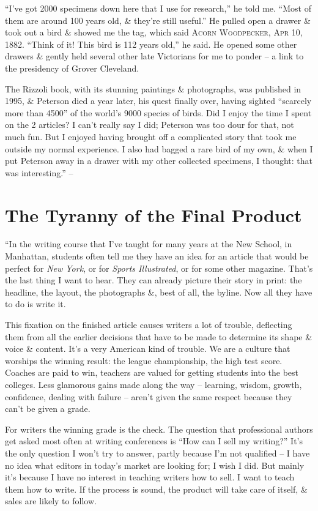 \documentclass{article}
\numberwithin{equation}{section}
\begin{document}
``I've got 2000 specimens down here that I use for research,'' he told me. ``Most of them are around 100 years old, \& they're still useful.'' He pulled open a drawer \& took out a bird \& showed me the tag, which said \textsc{Acorn Woodpecker, Apr 10, 1882}. ``Think of it! This bird is 112 years old,'' he said. He opened some other drawers \& gently held several other late Victorians for me to ponder -- a link to the presidency of Grover Cleveland.

The Rizzoli book, with its stunning paintings \& photographs, was published in 1995, \& Peterson died a year later, his quest finally over, having sighted ``scarcely more than 4500'' of the world's 9000 species of birds. Did I enjoy the time I spent on the 2 articles? I can't really say I did; Peterson was too dour for that, not much fun. But I enjoyed having brought off a complicated story that took me outside my normal experience. I also had bagged a rare bird of my own, \& when I put Peterson away in a drawer with my other collected specimens, I thought: that was interesting.'' -- \cite[pp. 227--236]{Zinsser2016}


\section{The Tyranny of the Final Product}
``In the writing course that I've taught for many years at the New School, in Manhattan, students often tell me they have an idea for an article that would be perfect for \textit{New York}, or for \textit{Sports Illustrated}, or for some other magazine. That's the last thing I want to hear. They can already picture their story in print: the headline, the layout, the photographs \&, best of all, the byline. Now all they have to do is write it.

This fixation on the finished article causes writers a lot of trouble, deflecting them from all the earlier decisions that have to be made to determine its shape \& voice \& content. It's a very American kind of trouble. We are a culture that worships the winning result: the league championship, the high test score. Coaches are paid to win, teachers are valued for getting students into the best colleges. Less glamorous gains made along the way -- learning, wisdom, growth, confidence, dealing with failure -- aren't given the same respect because they can't be given a grade.

For writers the winning grade is the check. The question that professional authors get asked most often at writing conferences is ``How can I sell my writing?'' It's the only question I won't try to answer, partly because I'm not qualified -- I have no idea what editors in today's market are looking for; I wish I did. But mainly it's because I have no interest in teaching writers how to sell. I want to teach them how to write. If the process is sound, the product will take care of itself, \& sales are likely to follow.
\end{document}
